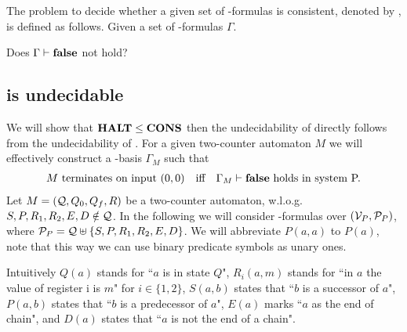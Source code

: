 \begin{definition}
	The problem to decide whether a given set of \SysP-formulas is consistent, denoted by \PCons, is defined as follows.
	Given a set of \SysP-formulas $\Gamma$. 
	\begin{center}
		Does $\Gamma\vdash\textbf{false}$ not hold?
	\end{center}
\end{definition}
\subsection{\PCons{} is undecidable}
We will show that $\textbf{HALT}\leq\textbf{CONS}$ then the undecidability of \PCons{} directly follows from the undecidability of \autHalt. For a given two-counter automaton $M$ we will effectively construct a \SysP-basis $\Gamma_M$ such that
\begin{align*}
 & \text{$M$ terminates on input $(0,0)$} &   & \text{iff} & \text{$\Gamma_M\vdash\textbf{false}$ holds in system P.} 
\end{align*}
Let $M=(\mathcal{Q},Q_0,Q_f,R)$ be a two-counter automaton, w.l.o.g. $S,P,R_1,R_2,E,D\notin\mathcal{Q}$. In the following we will consider \SysP-formulas over $(\mathcal{V}_P,\mathcal{P}_P)$, where $\mathcal{P}_P=\mathcal{Q}\uplus\{S,P,R_1,R_2,E,D\}$. We will abbreviate $P(a,a)$ to $P(a)$, note that this way we can use binary predicate symbols as unary ones.

Intuitively $Q(a)$ stands for ``$a$ is in state $Q$", $R_i(a,m)$ stands for ``in $a$ the value of register i is $m$" for $i\in\{1,2\}$, $S(a,b)$ states that ``$b$ is a successor of $a$", $P(a,b)$ states that ``$b$ is a predecessor of $a$", $E(a)$ marks ``$a$ as the end of chain", and $D(a)$ states that ``$a$ is not the end of a chain".

